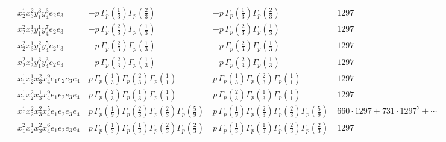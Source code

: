 \documentclass[11pt]{article}
\begin{document}
\begin{table}[ht]
{\begin{tabular}{@{}lllll@{}}
 & $x_{2}^{1} x_{3}^{2} y_{1}^{3} y_{4}^{3} e_{2} e_{3}$ & $- p \, \Gamma_p \left( \frac{1}{3} \right) \Gamma_p \left( \frac{2}{3} \right)$ & $- p \, \Gamma_p \left( \frac{1}{3} \right) \Gamma_p \left( \frac{2}{3} \right)$ & $1297$ \\
 & $x_{2}^{2} x_{3}^{1} y_{1}^{1} y_{4}^{7} e_{2} e_{3}$ & $- p \, \Gamma_p \left( \frac{2}{3} \right) \Gamma_p \left( \frac{1}{3} \right)$ & $- p \, \Gamma_p \left( \frac{2}{3} \right) \Gamma_p \left( \frac{1}{3} \right)$ & $1297$ \\
 & $x_{2}^{2} x_{3}^{1} y_{1}^{2} y_{4}^{5} e_{2} e_{3}$ & $- p \, \Gamma_p \left( \frac{2}{3} \right) \Gamma_p \left( \frac{1}{3} \right)$ & $- p \, \Gamma_p \left( \frac{2}{3} \right) \Gamma_p \left( \frac{1}{3} \right)$ & $1297$ \\
 & $x_{2}^{2} x_{3}^{1} y_{1}^{3} y_{4}^{3} e_{2} e_{3}$ & $- p \, \Gamma_p \left( \frac{2}{3} \right) \Gamma_p \left( \frac{1}{3} \right)$ & $- p \, \Gamma_p \left( \frac{2}{3} \right) \Gamma_p \left( \frac{1}{3} \right)$ & $1297$ \\
 & $x_{1}^{1} x_{2}^{1} x_{3}^{2} x_{4}^{9}  e_{1} e_{2} e_{3} e_{4}$ & $p \, \Gamma_p \left( \frac{1}{3} \right) \Gamma_p \left( \frac{2}{3} \right) \Gamma_p \left( \frac{1}{1} \right)$ & $p \, \Gamma_p \left( \frac{1}{3} \right) \Gamma_p \left( \frac{2}{3} \right) \Gamma_p \left( \frac{1}{1} \right)$ & $1297$ \\
 & $x_{1}^{1} x_{2}^{2} x_{3}^{1} x_{4}^{9}  e_{1} e_{2} e_{3} e_{4}$ & $p \, \Gamma_p \left( \frac{2}{3} \right) \Gamma_p \left( \frac{1}{3} \right) \Gamma_p \left( \frac{1}{1} \right)$ & $p \, \Gamma_p \left( \frac{2}{3} \right) \Gamma_p \left( \frac{1}{3} \right) \Gamma_p \left( \frac{1}{1} \right)$ & $1297$ \\
 & $x_{1}^{1} x_{2}^{2} x_{3}^{2} x_{4}^{5}  e_{1} e_{2} e_{3} e_{4}$ & $p \, \Gamma_p \left( \frac{1}{9} \right) \Gamma_p \left( \frac{2}{3} \right) \Gamma_p \left( \frac{2}{3} \right) \Gamma_p \left( \frac{5}{9} \right)$ & $p \, \Gamma_p \left( \frac{1}{9} \right) \Gamma_p \left( \frac{2}{3} \right) \Gamma_p \left( \frac{2}{3} \right) \Gamma_p \left( \frac{5}{9} \right)$ & $660{\cdot}1297{+}731{\cdot}1297^{2}{+}\cdots$ \\
 & $x_{1}^{2} x_{2}^{1} x_{3}^{2} x_{4}^{6}  e_{1} e_{2} e_{3} e_{4}$ & $p \, \Gamma_p \left( \frac{1}{3} \right) \Gamma_p \left( \frac{1}{3} \right) \Gamma_p \left( \frac{2}{3} \right) \Gamma_p \left( \frac{2}{3} \right)$ & $p \, \Gamma_p \left( \frac{1}{3} \right) \Gamma_p \left( \frac{1}{3} \right) \Gamma_p \left( \frac{2}{3} \right) \Gamma_p \left( \frac{2}{3} \right)$ & $1297$ \\

\end{tabular}}
\end{table}
\end{document}
